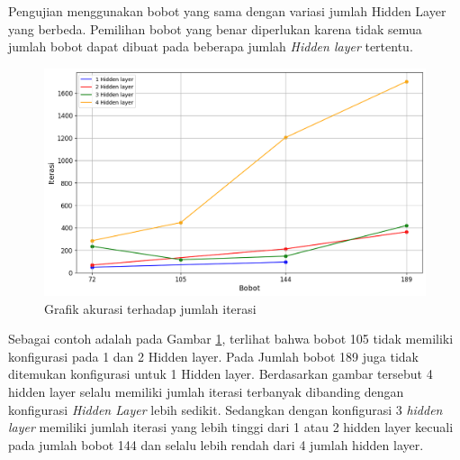 Pengujian menggunakan bobot yang sama dengan variasi jumlah Hidden Layer yang berbeda. Pemilihan bobot yang benar diperlukan karena tidak semua jumlah bobot dapat dibuat pada beberapa jumlah \textit{Hidden layer} tertentu.

\begin{figure}[H]
    \centering
    \includegraphics[width=14cm]{contents/chapter-4/6.png}
    \caption{Grafik akurasi terhadap jumlah iterasi}
    \label{fig:Grafik Akurasi 1}
\end{figure}

Sebagai contoh adalah pada Gambar \ref{fig:Grafik Akurasi 1}, terlihat bahwa bobot 105 tidak memiliki konfigurasi pada 1 dan 2 Hidden layer. Pada Jumlah bobot 189 juga tidak ditemukan konfigurasi untuk 1 Hidden layer. Berdasarkan gambar tersebut 4 hidden layer selalu memiliki jumlah iterasi terbanyak dibanding dengan konfigurasi \textit{Hidden Layer} lebih sedikit. Sedangkan dengan  konfigurasi 3 \textit{hidden layer} memiliki jumlah iterasi yang lebih tinggi dari 1 atau 2 hidden layer kecuali pada jumlah bobot 144 dan selalu lebih rendah dari 4 jumlah hidden layer. 
